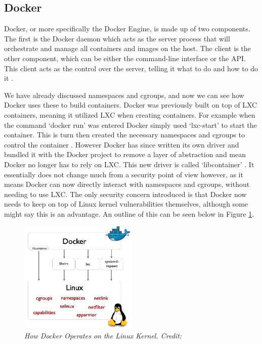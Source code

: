 \documentclass{article}
\begin{document}
\subsection{Docker}
\label{subs:Docker}

Docker, or more specifically the Docker Engine, is made up of two components. The first is the Docker daemon which acts as the server process that will orchestrate and manage all containers and images on the host. The client is the other component, which can be either the command-line interface or the API. This client acts as the control over the server, telling it what to do and how to do it \citep{Docker2016}.

We have already discussed namespaces and cgroups, and now we can see how Docker uses these to build containers. Docker was previously built on top of LXC containers, meaning it utilized LXC when creating containers. For example when the command `docker run' was entered Docker simply used `lxc-start' to start the container. This is turn then created the necessary namespaces and cgroups to control the container \citep{Petazzoni2013}. However Docker has since written its own driver and bundled it with the Docker project to remove a layer of abstraction and mean Docker no longer has to rely on LXC. This new driver is called `libcontainer' \citep{Hykes2014}. It essentially does not change much from a security point of view however, as it means Docker can now directly interact with namespaces and cgroups, without needing to use LXC. The only security concern introduced is that Docker now needs to keep on top of Linux kernel vulnerabilities themselves, although some might say this is an advantage. An outline of this can be seen below in Figure \ref{fig:kernel}.

\begin{figure}[!h]
\centering
\includegraphics*[width=0.5\textwidth]{components/images/docker-driver}
\caption{\em How Docker Operates on the Linux Kernel. Credit: \citep{Hykes2014}}
\label{fig:kernel}
\end{figure}
\end{document}
